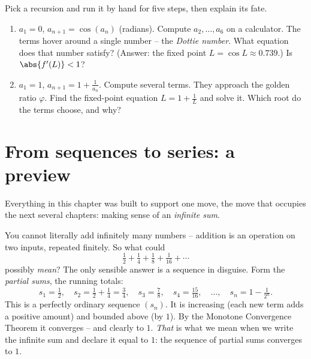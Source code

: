 \begin{labbox}
Pick a recursion and run it by hand for five steps, then explain its fate.
\begin{enumerate}
  \item $a_1 = 0$, $a_{n+1} = \cos(a_n)$ (radians). Compute $a_2,\dots,a_6$ on a
        calculator. The terms hover around a single number -- the
        \emph{Dottie number}. What equation does that number satisfy? (Answer:
        the fixed point $L = \cos L \approx 0.739$.) Is $\abs{f'(L)} < 1$?
  \item $a_1 = 1$, $a_{n+1} = 1 + \tfrac1{a_n}$. Compute several terms. They
        approach the golden ratio $\varphi$. Find the fixed-point equation $L =
        1 + \tfrac1L$ and solve it. Which root do the terms choose, and why?
\end{enumerate}
\end{labbox}

\section{From sequences to series: a preview}
\label{ch28:to-series}

Everything in this chapter was built to support one move, the move that occupies
the next several chapters: making sense of an \emph{infinite sum}.

You cannot literally add infinitely many numbers -- addition is an operation on
two inputs, repeated finitely. So what could
\[
  \tfrac12 + \tfrac14 + \tfrac18 + \tfrac1{16} + \cdots
\]
possibly \emph{mean}? The only sensible answer is a sequence in
disguise. Form the \emph{partial sums}, the running totals:
\[
  s_1 = \tfrac12,\quad
  s_2 = \tfrac12 + \tfrac14 = \tfrac34,\quad
  s_3 = \tfrac78,\quad
  s_4 = \tfrac{15}{16},\quad \dots,\quad
  s_n = 1 - \tfrac1{2^n}.
\]
This is a perfectly ordinary sequence $(s_n)$. It is increasing (each new term
adds a positive amount) and bounded above (by $1$). By the Monotone Convergence
Theorem it converges -- and clearly to $1$. \emph{That} is what we mean when we
write the infinite sum and declare it equal to $1$: the sequence of partial sums
converges to $1$.

